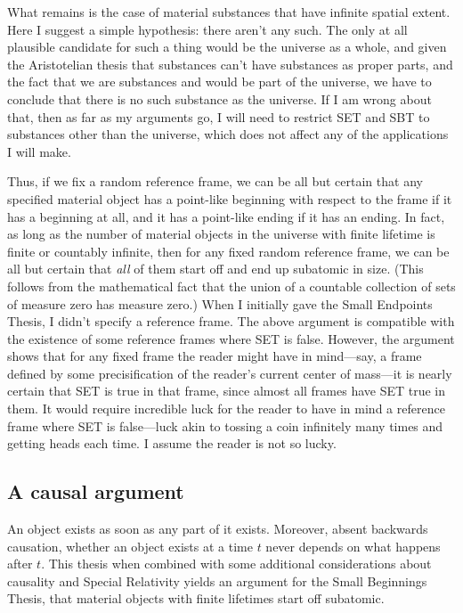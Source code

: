 What remains is the case of material substances that have infinite spatial extent. Here I suggest a simple hypothesis: there aren't
any such. The only at all plausible candidate for such a thing would be the universe as a whole, and given the Aristotelian 
thesis that substances can't have substances as proper parts, and the fact that we are substances and would be part of the universe,
we have to conclude that there is no such substance as the universe. If I am wrong about that, then as far as my arguments go,
I will need to restrict SET and SBT to substances other than the universe, which does not affect any of the applications I will
make.

Thus, if we fix a random reference frame, we can be all but certain that any specified material object has a point-like 
beginning with respect to the frame if it has a beginning at all, and it has a point-like ending if it has an ending. In fact, 
as long as the number of material objects in 
the universe with finite lifetime is finite or countably infinite, then for any fixed random reference frame, we can be all 
but certain that \textit{all} of them start off and end up subatomic in size. (This follows from the mathematical fact that the 
union of a countable collection of sets of measure zero has measure zero.) When I initially gave the Small Endpoints Thesis, 
I didn't specify a reference frame. The above argument is compatible with the existence of some reference frames where SET is 
false. However, the argument shows that for any fixed frame the reader might have in mind---say, a frame defined by some 
precisification of the reader's current center of mass---it is nearly certain that SET is true in that frame, since 
almost all frames have SET true in them. It would require incredible luck for the reader to have in mind a reference 
frame where SET is false—luck akin to tossing a coin infinitely many times and getting heads each time. I assume the reader is not so lucky.

\subsection{A causal argument}
An object exists as soon as any part of it exists. Moreover, absent backwards causation, whether an object 
exists at a time $t$ never depends on what happens after $t$. This thesis when combined with some additional 
considerations about causality and Special Relativity yields an argument for the Small Beginnings Thesis, 
that material objects with finite lifetimes start off subatomic. 

